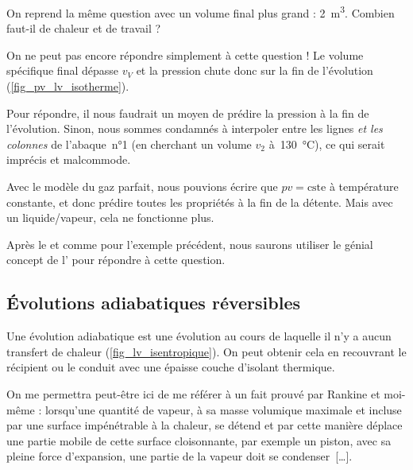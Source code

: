 			
			\begin{anexample}
			
			On reprend la même question avec un volume final plus grand : \SI{2}{\metre\cubed}. Combien faut-il de chaleur et de travail ?
					
				\begin{answer}
				On ne peut pas encore répondre simplement à cette question ! Le volume spécifique final dépasse $v_V$ et la pression chute donc sur la fin de l’évolution (\cref{fig_pv_lv_isotherme}).
				
				Pour répondre, il nous faudrait un moyen de prédire la pression à la fin de l’évolution. Sinon, nous sommes condamnés à interpoler entre les lignes \emph{et les colonnes} de l’abaque~n°1 (en cherchant un volume $v_2$ à~\SI{130}{\degreeCelsius}), ce qui serait imprécis et malcommode.
				
				\begin{remark}Avec le modèle du gaz parfait, nous pouvions écrire que $p v = \text{cste}$ à température constante, et donc prédire toutes les propriétés à la fin de la détente. Mais avec un liquide/vapeur, cela ne fonctionne plus.\end{remark}
				\begin{remark}Après le \courshuitshort et comme pour l’exemple précédent, nous saurons utiliser le génial concept de l’ pour répondre à cette question.\end{remark}\end{answer}
			\end{anexample}




	\subsection{Évolutions adiabatiques réversibles}
		\label{ch_lv_isentropiques}

		Une évolution adiabatique est une évolution au cours de laquelle il n’y a aucun transfert de chaleur (\cref{fig_lv_isentropique}). On peut obtenir cela en recouvrant le récipient ou le conduit avec une épaisse couche d’isolant thermique.
		
		On me permettra peut-être ici de me référer à un fait prouvé par Rankine et moi-même : lorsqu’une quantité de vapeur, à sa masse volumique maximale et incluse par une surface impénétrable à la chaleur, se détend et par cette manière déplace une partie mobile de cette surface cloisonnante, par exemple un piston, avec sa pleine force d’expansion, une partie de la vapeur doit se condenser~[…].
		
